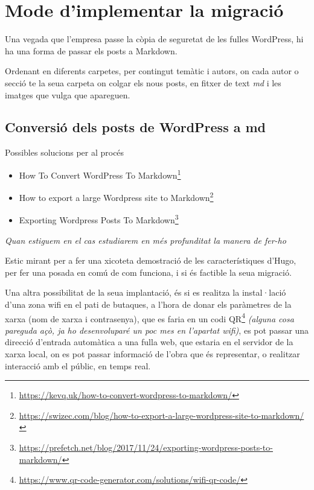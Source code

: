 \documentclass[
  10pt,
]{krantz}
\DeclareRobustCommand{\href}[2]{#2\footnote{\url{#1}}}
\providecommand{\tightlist}{%
  \setlength{\itemsep}{0pt}\setlength{\parskip}{0pt}}
\begin{document}
\hypertarget{mode-dimplementar-la-migraciuxf3}{%
\section{Mode d'implementar la migració}\label{mode-dimplementar-la-migraciuxf3}}

Una vegada que l'empresa passe la còpia de seguretat de les fulles WordPress, hi ha una forma de passar els posts a Markdown.

Ordenant en diferents carpetes, per contingut temàtic i autors, on cada autor o secció te la seua carpeta on colgar els nous posts, en fitxer de text \emph{md} i les imatges que vulga que apareguen.

\hypertarget{conversiuxf3-dels-posts-de-wordpress-a-md}{%
\subsection{Conversió dels posts de WordPress a md}\label{conversiuxf3-dels-posts-de-wordpress-a-md}}

Possibles solucions per al procés

\begin{itemize}
\tightlist
\item
  \href{https://kevq.uk/how-to-convert-wordpress-to-markdown/}{How To Convert WordPress To Markdown}
\item
  \href{https://swizec.com/blog/how-to-export-a-large-wordpress-site-to-markdown/}{How to export a large Wordpress site to Markdown}
\item
  \href{https://prefetch.net/blog/2017/11/24/exporting-wordpress-posts-to-markdown/}{Exporting Wordpress Posts To Markdown}
\end{itemize}

\emph{Quan estiguem en el cas estudiarem en més profunditat la manera de fer-ho}

Estic mirant per a fer una xicoteta demostració de les característiques d'Hugo, per fer una posada en comú de com funciona, i si és factible la seua migració.

Una altra possibilitat de la seua implantació, és si es realitza la instal·lació d'una zona wifi en el pati de butaques, a l'hora de donar els paràmetres de la xarxa (nom de xarxa i contrasenya), que es faria en un codi \href{https://www.qr-code-generator.com/solutions/wifi-qr-code/}{QR} \emph{(alguna cosa pareguda açò, ja ho desenvoluparé un poc mes en l'apartat wifi)}, es pot passar una direcció d'entrada automàtica a una fulla web, que estaria en el servidor de la xarxa local, on es pot passar informació de l'obra que és representar, o realitzar interacció amb el públic, en temps real.
\end{document}
